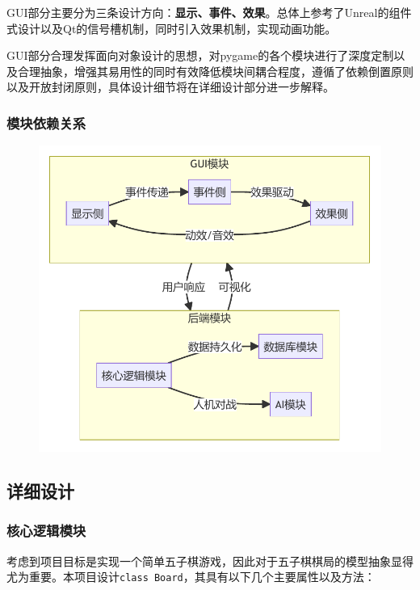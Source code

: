 \documentclass[a4paper, AutoFakeBold=2.17 ,zihao=-4]{ctexart}
\begin{document}
GUI部分主要分为三条设计方向：\textbf{显示、事件、效果}。总体上参考了Unreal的组件式设计以及Qt的信号槽机制，同时引入效果机制，实现动画功能。

GUI部分合理发挥面向对象设计的思想，对pygame的各个模块进行了深度定制以及合理抽象，增强其易用性的同时有效降低模块间耦合程度，遵循了依赖倒置原则以及开放封闭原则，具体设计细节将在详细设计部分进一步解释。

\subsubsection{模块依赖关系}

\begin{figure}[H]
    \centering
    \includegraphics[width=0.6\columnwidth]{System Relationship Diagram}
\end{figure}

\subsection{详细设计}

\subsubsection{核心逻辑模块}

考虑到项目目标是实现一个简单五子棋游戏，因此对于五子棋棋局的模型抽象显得尤为重要。本项目设计\texttt{class Board}，其具有以下几个主要属性以及方法：
\end{document}
